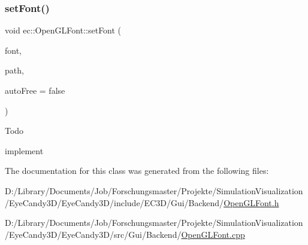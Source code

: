\subsubsection{\texorpdfstring{set\+Font()}{setFont()}}
{\footnotesize\ttfamily void ec\+::\+Open\+G\+L\+Font\+::set\+Font (\begin{DoxyParamCaption}\item[{\mbox{\hyperlink{classec_1_1_font_texture_atlas}{ec\+::\+Font\+Texture\+Atlas}} $\ast$}]{font,  }\item[{const std\+::string \&}]{path,  }\item[{bool}]{auto\+Free = {\ttfamily false} }\end{DoxyParamCaption})\hspace{0.3cm}{\ttfamily [virtual]}}

\begin{DoxyRefDesc}{Todo}
\item[\mbox{\hyperlink{todo__todo000008}{Todo}}]implement \end{DoxyRefDesc}


The documentation for this class was generated from the following files\+:\begin{DoxyCompactItemize}
\item 
D\+:/\+Library/\+Documents/\+Job/\+Forschungsmaster/\+Projekte/\+Simulation\+Visualization/\+Eye\+Candy3\+D/\+Eye\+Candy3\+D/include/\+E\+C3\+D/\+Gui/\+Backend/\mbox{\hyperlink{_open_g_l_font_8h}{Open\+G\+L\+Font.\+h}}\item 
D\+:/\+Library/\+Documents/\+Job/\+Forschungsmaster/\+Projekte/\+Simulation\+Visualization/\+Eye\+Candy3\+D/\+Eye\+Candy3\+D/src/\+Gui/\+Backend/\mbox{\hyperlink{_open_g_l_font_8cpp}{Open\+G\+L\+Font.\+cpp}}\end{DoxyCompactItemize}
